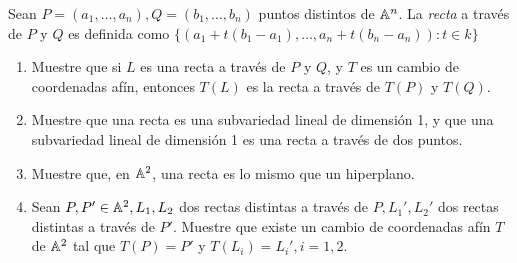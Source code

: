 \begin{prob}{2.15}
    Sean \(P=(a_1,\dots ,a_n),Q=(b_1,\dots ,b_n)\) puntos distintos de \(\mathbb{A}^n\). La \textit{recta} a través de \(P\) y \(Q\) es definida como \(\{(a_1+t(b_1-a_1),\dots ,a_n+t(b_n-a_n)):t\in k\}\)
    \begin{enumerate}
        \item Muestre que si \(L\) es una recta a través de \(P\) y \(Q\), y \(T\) es un cambio de coordenadas afín, entonces \(T(L)\) es la recta a través de \(T(P)\) y \(T(Q)\).
        \item Muestre que una recta es una subvariedad lineal de dimensión 1, y que una subvariedad lineal de dimensión 1 es una recta a través de dos puntos.
        \item Muestre que, en \(\mathbb{A}^2\), una recta es lo mismo que un hiperplano.
        \item Sean \(P,P'\in\mathbb{A}^2,L_1,L_2\) dos rectas distintas a través de \(P,L_1',L_2'\) dos rectas distintas a través de \(P'\). Muestre que existe un cambio de coordenadas afín \(T\) de \(\mathbb{A}^2\) tal que \(T(P)=P'\) y \(T(L_i)=L_i',i=1,2\).
    \end{enumerate}
\end{prob}

